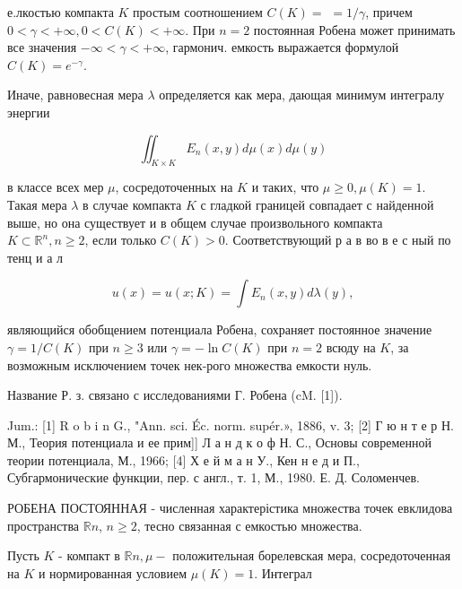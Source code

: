 \documentclass[10pt]{article}
\begin{document}
е.лкостью компакта $K$ простым соотношением $C(K)=$ $=1 / \gamma$, причем $0<\gamma<+\infty, 0<C(K)<+\infty$. При $n=2$ постоянная Робена может принимать все значения $-\infty<\gamma<+\infty$, гармонич. емкость выражается формулой $C(K)=e^{-\gamma}$.



Иначе, равновесная мера $\lambda$ определяется как мера, дающая минимум интегралу энергии



\[

\iint_{K \times K} E_{n}(x, y) d \mu(x) d \mu(y)

\]



в классе всех мер $\mu$, сосредоточенных на $K$ и таких, что $\mu \geqslant 0, \mu(K)=1$. Такая мера $\lambda$ в случае компакта $K$ с гладкой границей совпадает с найденной выше, но она существует и в общем случае произвольного компакта $K \subset \mathbb{R}^{n}, n \geqslant 2$, если только $C(K)>0$. Соответствующий р а в во в е с ный по тенц и а л



\[

u(x)=u(x ; K)=\int E_{n}(x, y) d \lambda(y),

\]



являющийся обобщением потенциала Робена, сохраняет постоянное значение $\gamma=1 / C(K)$ при $n \geqslant 3$ или $\gamma=-\ln C(K)$ при $n=2$ всюду на $K$, за возможным исключением точек нек-рого множества емкости нуль.



Название Р. з. связано с исследованиями Г. Робена (cM. [1]).



Jum.: [1] R o b i n G., "Ann. sci. Éc. norm. supér.», 1886, v. 3; [2] Г ю н т е р Н. М., Теория потенциала и ее прим]] Л а н д к о ф Н. С., Основы современной теории потенциала, М., 1966; [4] Х е й м а н У., Кен н е д и П., Субгармонические функции, пер. с англ., т. 1, М., 1980. Е. Д. Соломенчев.



РОБЕНА ПОСТОЯННАЯ - численная характерістика множества точек евклидова пространства $\mathbb{R} n$, $n \geqslant 2$, тесно связанная с емкостью множества.



Пусть $K$ - компакт в $\mathbb{R} n, \mu-$ положительная борелевская мера, сосредоточенная на $K$ и нормированная условием $\mu(K)=1$. Интеграл
\end{document}
